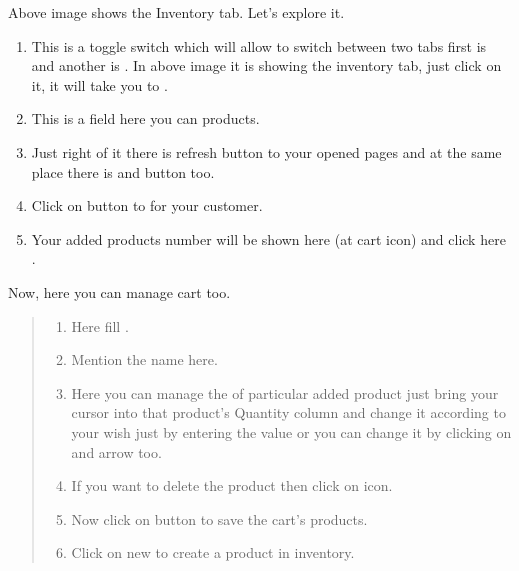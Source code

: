\documentclass[letterpaper,10pt,english]{sphinxmanual}
\begin{document}
Above image shows the Inventory tab. Let’s explore it.
\begin{enumerate}
\item {} 
This is a toggle switch which will allow to switch between two tabs first is  and another is  . In above image it is showing the inventory tab, just click on it, it will take you to  .

\item {} 
This is a  field here you can  products.

\item {} 
Just right of it there is refresh button to  your opened pages and at the same place there is  and  button too.

\item {} 
Click on  button to for your customer.

\item {} 
Your added products number will be shown here (at cart icon) and click here .

\end{enumerate}

\begin{figure}[htbp]
\centering

\noindent{}
\end{figure}

Now, here you can manage cart too.
\begin{quote}
\begin{enumerate}
\item {} 
Here fill  .

\item {} 
Mention the  name here.

\item {} 
Here you can manage the  of particular added product just bring your cursor into that product’s Quantity column and change it according to your wish just by entering the value or you can change it by clicking on  and  arrow too.

\item {} 
If you want to delete the product then click on  icon.

\item {} 
Now click on  button to save the cart’s products.

\end{enumerate}
\begin{enumerate}
\setcounter{enumi}{5}
\item {} 
Click on new to create a  product in inventory.

\end{enumerate}
\end{quote}
\end{document}
